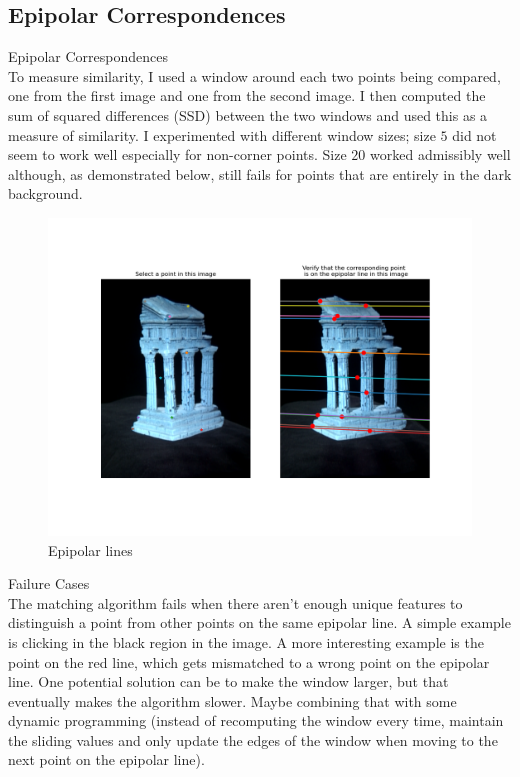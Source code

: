 \newpage
\subsection{Epipolar Correspondences}

\begin{enumarabic}
  \item Epipolar Correspondences \\
    To measure similarity, I used a window around each two points being compared,
    one from the first image and one from the second image.
    I then computed the sum of squared differences (SSD) between the two windows
    and used this as a measure of similarity.
    I experimented with different window sizes; size $5$ did not seem to
    work well especially for non-corner points.
    Size $20$ worked admissibly well although, as demonstrated below,
    still fails for points that are entirely in the dark background.

    \begin{figure}[H]
      \centering
      \includegraphics[width=\textwidth]{./figures/epipolar-correspondences.png}
      \caption{Epipolar lines}
    \end{figure}

  \newpage
  \item Failure Cases \\
    The matching algorithm fails when there aren't enough unique features
    to distinguish a point from other points on the same epipolar line.
    A simple example is clicking in the black region in the image.
    A more interesting example is the point on the red line,
    which gets mismatched to a wrong point on the epipolar line.
    One potential solution can be to make the window larger,
    but that eventually makes the algorithm slower.
    Maybe combining that with some dynamic programming
    (instead of recomputing the window every time, maintain the
    sliding values and only update the edges of the window when
    moving to the next point on the epipolar line).


\end{enumarabic}
